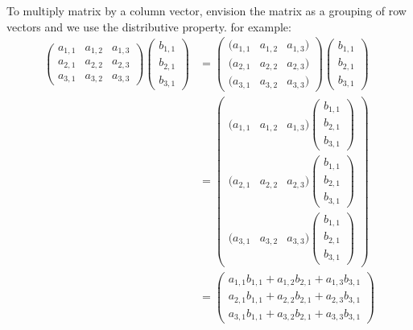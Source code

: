 \documentclass{ximera}
\begin{document}
To multiply matrix by a column vector, envision the matrix as a
grouping of row vectors and we use the distributive property. for
example:
\begin{align*}
\begin{pmatrix}
  a_{1,1} & a_{1,2} & a_{1,3} \\
  a_{2,1} & a_{2,2} & a_{2,3} \\
  a_{3,1} & a_{3,2} & a_{3,3}
\end{pmatrix}
\begin{pmatrix} b_{1,1} \\ b_{2,1} \\ b_{3,1} \end{pmatrix}
&=
\begin{pmatrix}
  (a_{1,1} & a_{1,2} & a_{1,3}) \\
  (a_{2,1} & a_{2,2} & a_{2,3}) \\
  (a_{3,1} & a_{3,2} & a_{3,3})
\end{pmatrix}
\begin{pmatrix} b_{1,1} \\ b_{2,1} \\ b_{3,1} \end{pmatrix}\\
&=
\begin{pmatrix}
  (a_{1,1} & a_{1,2} & a_{1,3}) \begin{pmatrix} b_{1,1} \\ b_{2,1} \\ b_{3,1} \end{pmatrix}\\
  (a_{2,1} & a_{2,2} & a_{2,3}) \begin{pmatrix} b_{1,1} \\ b_{2,1} \\ b_{3,1} \end{pmatrix}\\
  (a_{3,1} & a_{3,2} & a_{3,3}) \begin{pmatrix} b_{1,1} \\ b_{2,1} \\ b_{3,1} \end{pmatrix}
\end{pmatrix}\\
&=
\begin{pmatrix}
  a_{1,1}b_{1,1} + a_{1,2}b_{2,1} + a_{1,3}b_{3,1}  \\
  a_{2,1}b_{1,1} + a_{2,2}b_{2,1} + a_{2,3}b_{3,1}  \\
  a_{3,1}b_{1,1} + a_{3,2}b_{2,1} + a_{3,3}b_{3,1}
\end{pmatrix}
\end{align*}
\end{document}
